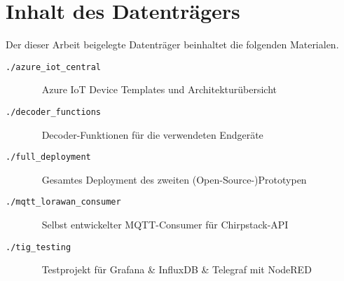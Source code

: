\section{Inhalt des Datenträgers}
\label{apx:Datentraeger}

Der dieser Arbeit beigelegte Datenträger beinhaltet die folgenden Materialen.

\begin{description}
\item[\texttt{./azure_iot_central}] ~ \linebreak 
\noindent\hspace*{10mm} Azure IoT Device Templates und Architekturübersicht
\item[\texttt{./decoder_functions}] ~ \linebreak 
\noindent\hspace*{10mm} Decoder-Funktionen für die verwendeten Endgeräte
\item[\texttt{./full_deployment}] ~ \linebreak 
\noindent\hspace*{10mm} Gesamtes Deployment des zweiten (Open-Source-)Prototypen
\item[\texttt{./mqtt_lorawan_consumer}] ~ \linebreak 
\noindent\hspace*{10mm} Selbst entwickelter MQTT-Consumer für Chirpstack-API
\item[\texttt{./tig_testing}] ~ \linebreak 
\noindent\hspace*{10mm} Testprojekt für Grafana \& InfluxDB \& Telegraf mit NodeRED
\end{description}